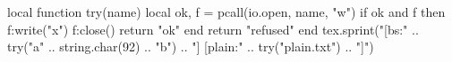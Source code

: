 \documentclass{article}
\begin{document}
\begin{luacode*}
local function try(name)
  local ok, f = pcall(io.open, name, "w")
  if ok and f then f:write("x") f:close() return "ok" end
  return "refused"
end
tex.sprint("[bs:" .. try("a" .. string.char(92) .. "b") .. "] [plain:" .. try("plain.txt") .. "]")
\end{luacode*}
\end{document}
